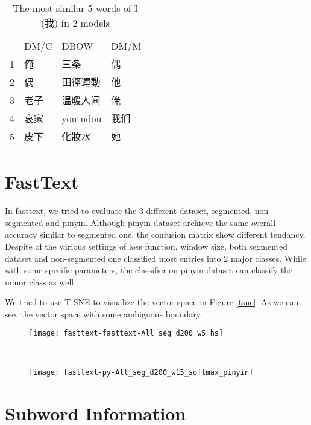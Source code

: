 \begin{table}[]
\centering
\caption{The most similar 5 words of I (我) in 2 models}
\label{table:doc2vec}
\begin{tabular}{llll}
      & DM/C & DBOW & DM/M \\
1 & 俺 &  三条  & 偶\\
2 & 偶  & 田徑運動 & 他\\
3 & 老子  & 温暖人间 & 俺\\
4 & 哀家  & youtudou & 我们\\
5 & 皮下  & 化妝水 & 她
\end{tabular}
\end{table}

\section{FastText}

In fasttext, we tried to evaluate the 3 different dataset, segmented, non-segmented and pinyin. 
Although pinyin dataset archieve the same overall accuracy similar to segmented one, the confusion matrix show different tendancy.
Despite of the various settings of loss function, window size, both segmented dataset and non-segmented one classified most entries into 2 major classes.
While with some specific parameters, the classifier on pinyin dataset can classify the minor class as well. 

We tried to use T-SNE to visualize the vector space in Figure \ref{tsne}. As we can see, the vector space with some ambiguous boundary.


\begin{figure*}[t!]
    \centering
     
    \begin{subfigure}[t]{0.5\textwidth}
        \centering
        \texttt{[image: fasttext-fasttext-All\_seg\_d200\_w5\_hs]}
        \caption{}
    \end{subfigure}%
    ~
    \begin{subfigure}[t]{0.5\textwidth}
        \centering
        \texttt{[image: fasttext-py-All\_seg\_d200\_w15\_softmax\_pinyin]}
        \caption{}
    \end{subfigure}
    \caption{Visualization of vector space for 2 dataset}
    \label{tsne}
\end{figure*}

\section{Subword Information}

